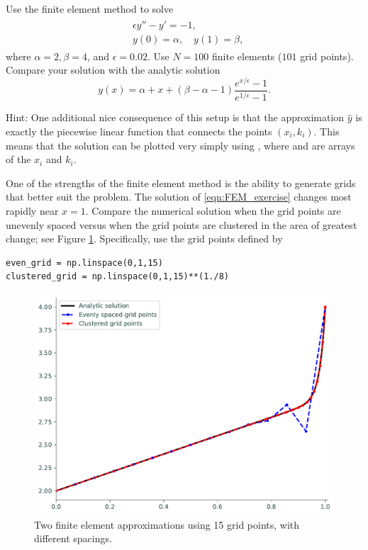 \begin{problem}
Use the finite element method to solve
\begin{align}
	\begin{split}
	&{ }\epsilon y'' - y' = -1,\\
	&{ }y(0) = \alpha, \quad y(1) = \beta,
	\end{split} \label{eqn:FEM_exercise}
\end{align}
where $\alpha = 2, \beta = 4$, and $\epsilon = 0.02$.
Use $N = 100$ finite elements ($101$ grid points).
Compare your solution with the analytic solution
\[y(x) = \alpha + x + (\beta - \alpha - 1 ) \frac{e^{x/\epsilon} -1}{e^{1/\epsilon} -1}.\]

Hint: 
One additional nice consequence of this setup is that the approximation \(\hat{y}\) is exactly the piecewise linear function that connects the points \((x_i, k_i)\).
This means that the solution can be plotted very simply using , where  and  are arrays of the \(x_i\) and \(k_i\).
\end{problem}

\begin{problem}
One of the strengths of the finite element method is the ability to generate grids that better suit the problem.
The solution of \eqref{eqn:FEM_exercise} changes most rapidly near $x = 1$.
Compare the numerical solution when the grid points are unevenly spaced versus when the grid points are clustered in the area of greatest change; see Figure \ref{fig:FEM_compare_methods}. Specifically, use the grid points defined by
\begin{lstlisting}
even_grid = np.linspace(0,1,15)
clustered_grid = np.linspace(0,1,15)**(1./8)
\end{lstlisting}
\end{problem}

\begin{figure}[ht]
\centering
\includegraphics[width=\textwidth]{figures/FEM_compare_methods.pdf}
\caption{Two finite element approximations using 15 grid points, with different spacings. }
\label{fig:FEM_compare_methods}
\end{figure}

